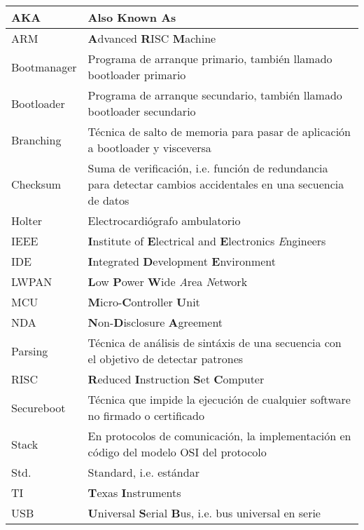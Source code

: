 \documentclass[12pt,a4paper]{article}
\begin{document}
\begin{table}[ht]
\label{tab:glossary}
	\centering
	\begin{tabularx}{\linewidth}{@{}|>{\columncolor[gray]{0.8}}l|X|@{}}
	\hline
	AKA    			& \textbf{A}lso \textbf{K}nown \textbf{A}s																			\\ \hline
	ARM     		& \textbf{A}dvanced \textbf{R}ISC \textbf{M}achine	     															\\ \hline	
	Bootmanager     & Programa de arranque primario, también llamado bootloader primario												\\ \hline
	Bootloader      & Programa de arranque secundario, también llamado bootloader secundario											\\ \hline
	Branching     	& Técnica de salto de memoria para pasar de aplicación a bootloader y visceversa									\\ \hline
	Checksum     	& Suma de verificación, i.e. función de redundancia para detectar cambios accidentales en una secuencia de datos 	\\ \hline
	Holter     		& Electrocardiógrafo ambulatorio     																				\\ \hline
	IEEE     		& \textbf{I}nstitute of \textbf{E}lectrical and \textbf{E}lectronics \textit{E}ngineers								\\ \hline
	IDE     		& \textbf{I}ntegrated \textbf{D}evelopment \textbf{E}nvironment														\\ \hline
	LWPAN     		& \textbf{L}ow \textbf{P}ower \textbf{W}ide \textit{A}rea \textit{N}etwork											\\ \hline
	MCU     		& \textbf{M}icro-\textbf{C}ontroller \textbf{U}nit																	\\ \hline
	NDA     		& \textbf{N}on-\textbf{D}isclosure \textbf{A}greement																\\ \hline
	Parsing    		& Técnica de análisis de sintáxis de una secuencia con el objetivo de detectar patrones								\\ \hline
	RISC			& \textbf{R}educed \textbf{I}nstruction \textbf{S}et \textbf{C}omputer												\\ \hline
	Secureboot     	& Técnica que impide la ejecución de cualquier software no firmado o certificado									\\ \hline
	Stack	     	& En protocolos de comunicación, la implementación en código del modelo OSI del protocolo							\\ \hline
	Std.     		& Standard, i.e. estándar							     															\\ \hline
	TI       		& \textbf{T}exas \textbf{I}nstruments				     															\\ \hline
	USB     		& \textbf{U}niversal \textbf{S}erial \textbf{B}us, i.e. bus universal en serie										\\ \hline
	\end{tabularx}
\end{table}
\end{document}
